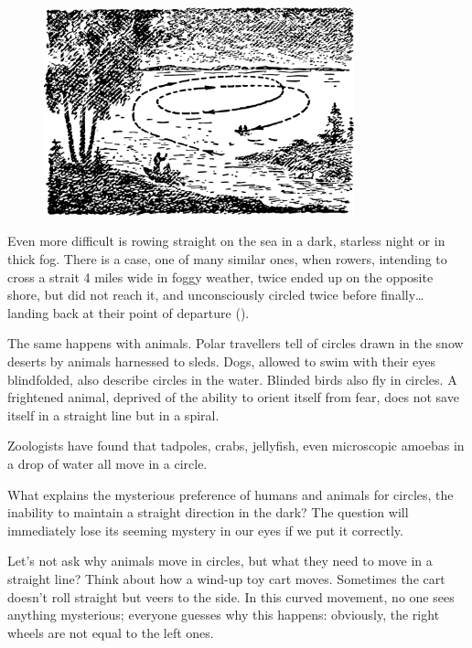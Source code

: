 \begin{figure}[h!]
\centering
\includegraphics[width=0.8\textwidth]{figures/ch-08/fig-114.pdf}
\end{figure}


Even more difficult is rowing straight on the sea in a dark, starless night or in thick fog. There is a case, one of many similar ones, when rowers, intending to cross a strait 4 miles wide in foggy weather, twice ended up on the opposite shore, but did not reach it, and unconsciously circled twice before finally\dots{} landing back at their point of departure ().

The same happens with animals. Polar travellers tell of circles drawn in the snow deserts by animals harnessed to sleds. Dogs, allowed to swim with their eyes blindfolded, also describe circles in the water. Blinded birds also fly in circles. A frightened animal, deprived of the ability to orient itself from fear, does not save itself in a straight line but in a spiral.

Zoologists have found that tadpoles, crabs, jellyfish, even microscopic amoebas in a drop of water all move in a circle.

What explains the mysterious preference of humans and animals for circles, the inability to maintain a straight direction in the dark? The question will immediately lose its seeming mystery in our eyes if we put it correctly.

Let's not ask why animals move in circles, but what they need to move in a straight line? Think about how a wind-up toy cart moves. Sometimes the cart doesn't roll straight but veers to the side. In this curved movement, no one sees anything mysterious; everyone guesses why this happens: obviously, the right wheels are not equal to the left ones.


